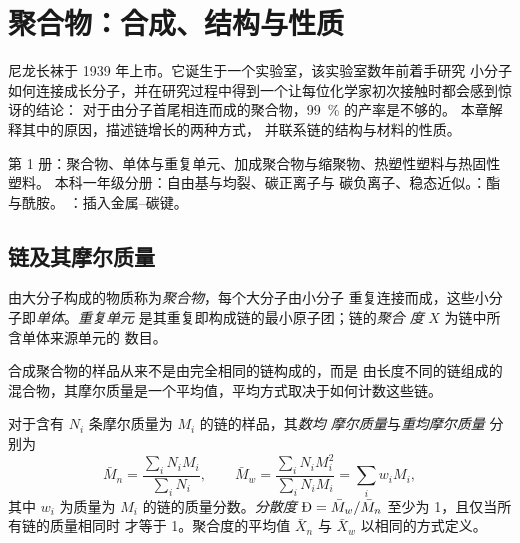 \chapter{聚合物：合成、结构与性质}\label{ch:b2:polymer-synthesis}

尼龙长袜于 1939 年上市。它诞生于一个实验室，该实验室数年前着手研究
小分子如何连接成长分子，并在研究过程中得到一个让每位化学家初次接触时都会感到惊讶的结论：
对于由分子首尾相连而成的聚合物，99~\% 的产率是不够的。
本章解释其中的原因，描述链增长的两种方式，
并联系链的结构与材料的性质。

\begin{recall}
第 1 册：聚合物、单体与重复单元、加成聚合物与缩聚物、热塑性塑料与热固性塑料。
本科一年级分册：自由基与均裂、碳正离子与
碳负离子、稳态近似。：酯与酰胺。
：插入金属–碳键。
\end{recall}

\section{链及其摩尔质量}

\begin{definition}[聚合物]\label{def:b2:polymer-synthesis:polymer}
由大分子构成的物质称为\emph{聚合物}，每个大分子由小分子
重复连接而成，这些小分子即\emph{单体}。\emph{重复单元}
是其重复即构成链的最小原子团；链的\emph{聚合
度} $X$ 为链中所含单体来源单元的
数目。
\end{definition}

合成聚合物的样品从来不是由完全相同的链构成的，而是
由长度不同的链组成的混合物，其摩尔质量是一个平均值，平均方式取决于如何计数这些链。

\begin{definition}[摩尔质量的平均值]\label{def:b2:polymer-synthesis:averages}
对于含有 $N_i$ 条摩尔质量为 $M_i$ 的链的样品，其\emph{数均
摩尔质量}与\emph{重均摩尔质量}
分别为
\begin{equation*}
\bar M_n = \frac{\sum_i N_i M_i}{\sum_i N_i}, \qquad
\bar M_w = \frac{\sum_i N_i M_i^2}{\sum_i N_i M_i} = \sum_i w_i M_i,
\end{equation*}
其中 $w_i$ 为质量为 $M_i$ 的链的质量分数。\emph{分散度}
$\text{\DH} = \bar M_w/\bar M_n$ 至少为 1，且仅当所有链的质量相同时
才等于 1。聚合度的平均值 $\bar X_n$ 与 $\bar X_w$
以相同的方式定义。
\end{definition}

